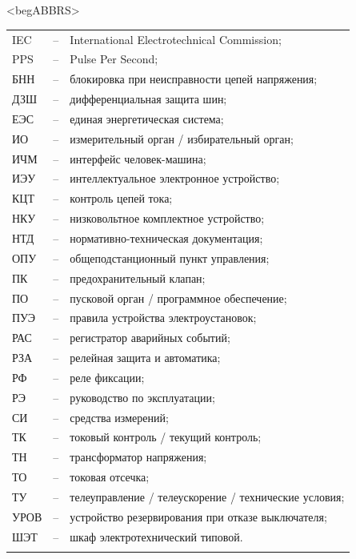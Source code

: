 \color{unidarkgreen}\section*{}
{\color{white}\fontsize{0.1pt}{0.1pt}\selectfont<begABBRS>}
\color{black}
\begin{longtable}{>{\raggedright\arraybackslash}m{2cm}>{\raggedright\arraybackslash}m{0.5cm}>{\raggedright\arraybackslash}m{20cm}}
\endfirsthead\endhead\endfoot\endlastfoot
IEC & -- &  International Electrotechnical Commission; \\
PPS & -- & Pulse Per Second; \\
БНН & -- & блокировка при неисправности цепей напряжения; \\
ДЗШ & -- & дифференциальная защита шин; \\
ЕЭС & -- & единая энергетическая система; \\
ИО & -- & измерительный орган / избирательный орган; \\
ИЧМ & -- & интерфейс человек-машина; \\
ИЭУ & -- & интеллектуальное электронное устройство; \\
КЦТ & -- & контроль цепей тока; \\
НКУ & -- & низковольтное комплектное устройство; \\
НТД & -- & нормативно-техническая документация; \\
ОПУ & -- & общеподстанционный пункт управления; \\
ПК & -- & предохранительный клапан; \\
ПО & -- & пусковой орган / программное обеспечение; \\
ПУЭ & -- & правила устройства электроустановок; \\
РАС & -- & регистратор аварийных событий; \\
РЗА & -- & релейная защита и автоматика; \\
РФ & -- & реле фиксации; \\
РЭ & -- & руководство по эксплуатации; \\
СИ & -- & средства измерений; \\
ТК & -- & токовый контроль / текущий контроль; \\
ТН & -- & трансформатор напряжения; \\
ТО & -- & токовая отсечка; \\
ТУ & -- & телеуправление / телеускорение / технические условия; \\
УРОВ & -- & устройство резервирования при отказе выключателя; \\
ШЭТ & -- & шкаф электротехнический типовой. \\
{\color{white}\fontsize{0.1pt}{0.1pt}\selectfont<endABBRS>}
\end{longtable}
